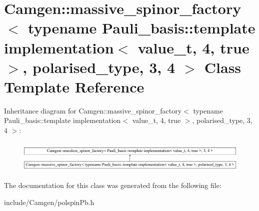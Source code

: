 \hypertarget{a00347}{\section{Camgen\-:\-:massive\-\_\-spinor\-\_\-factory$<$ typename Pauli\-\_\-basis\-:\-:template implementation$<$ value\-\_\-t, 4, true $>$, polarised\-\_\-type, 3, 4 $>$ Class Template Reference}
\label{a00347}
}
Inheritance diagram for Camgen\-:\-:massive\-\_\-spinor\-\_\-factory$<$ typename Pauli\-\_\-basis\-:\-:template implementation$<$ value\-\_\-t, 4, true $>$, polarised\-\_\-type, 3, 4 $>$\-:\begin{figure}[H]
\begin{center}
\leavevmode
\includegraphics[height=1.538461cm]{a00347}
\end{center}
\end{figure}


The documentation for this class was generated from the following file\-:\begin{DoxyCompactItemize}
\item 
include/\-Camgen/polspin\-Pb.\-h\end{DoxyCompactItemize}
